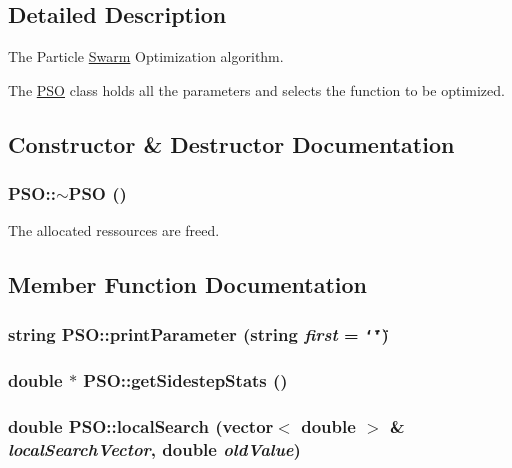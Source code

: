 \subsection{Detailed Description}
The Particle \hyperlink{classSwarm}{Swarm} Optimization algorithm. 

The \hyperlink{classPSO}{PSO} class holds all the parameters and selects the function to be optimized. 

\subsection{Constructor \& Destructor Documentation}
\hypertarget{classPSO_0c180ecbb9a5d7c492d47e73d448932f}{
\subsubsection{\setlength{\rightskip}{0pt plus 5cm}PSO::$\sim$PSO ()}}
\label{classPSO_0c180ecbb9a5d7c492d47e73d448932f}


The allocated ressources are freed. 



\subsection{Member Function Documentation}
\hypertarget{classPSO_bf1bde2032c0f5be197934475851c216}{
\subsubsection{\setlength{\rightskip}{0pt plus 5cm}string PSO::printParameter (string {\em first} = {\tt \char`\"{}\char`\"{}})}}
\label{classPSO_bf1bde2032c0f5be197934475851c216}


\hypertarget{classPSO_ea4f1240fec26e21f9ef3ed3831f08e4}{
\subsubsection{\setlength{\rightskip}{0pt plus 5cm}double $\ast$ PSO::getSidestepStats ()}}
\label{classPSO_ea4f1240fec26e21f9ef3ed3831f08e4}


\hypertarget{classPSO_04484a7607a0bafc3b66f5de4609568d}{
\subsubsection{\setlength{\rightskip}{0pt plus 5cm}double PSO::localSearch (vector$<$ double $>$ \& {\em localSearchVector}, \/  double {\em oldValue})}}
\label{classPSO_04484a7607a0bafc3b66f5de4609568d}


